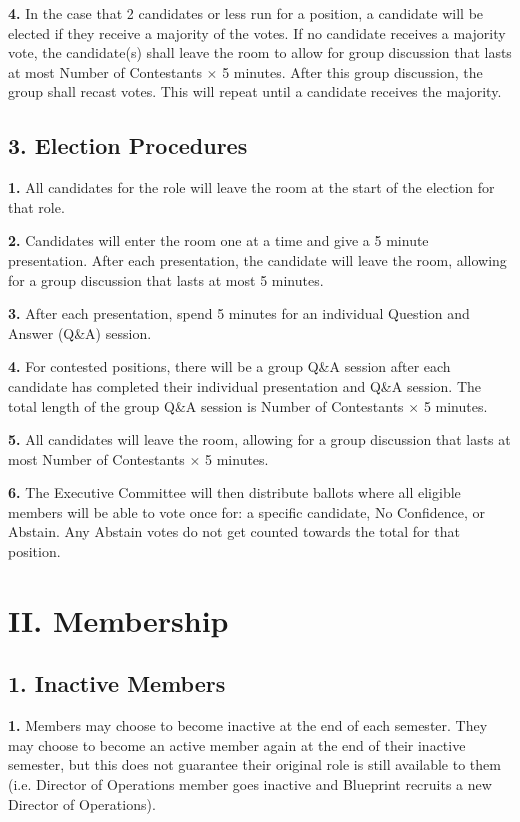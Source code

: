 \documentclass{article}
\begin{document}
\textbf{4.} In the case that 2 candidates or less run for a position, a candidate will be elected if they receive a majority of the votes. If no candidate receives a majority vote, the candidate(s) shall leave the room to allow for group discussion that lasts at most Number of Contestants $\times$ 5 minutes. After this group discussion, the group shall recast votes. This will repeat until a candidate receives the majority.  

\subsection{3. Election Procedures}

\textbf{1.} All candidates for the role will leave the room at the start of the election for that role. 

\textbf{2.} Candidates will enter the room one at a time and give a 5 minute presentation. After each presentation, the candidate will leave the room, allowing for a group discussion that lasts at most 5 minutes.

\textbf{3.} After each presentation, spend 5 minutes for an individual Question and Answer (Q\&A) session.

\textbf{4.} For contested positions, there will be a group Q\&A session after each candidate has completed their individual presentation and Q\&A session. The total length of the group Q\&A session is Number of Contestants $\times$ 5 minutes.

\textbf{5.} All candidates will leave the room, allowing for a group discussion that lasts at most Number of Contestants $\times $ 5 minutes. 

\textbf{6.} The Executive Committee will then distribute ballots where all eligible members will be able to vote once for: a specific candidate, No Confidence, or Abstain. Any Abstain votes do not get counted towards the total for that position. 

\section{II. Membership}

\subsection{1. Inactive Members}

\textbf{1.} Members may choose to become inactive at the end of each semester. They may choose to become an active member again at the end of their inactive semester, but this does not guarantee their original role is still available to them (i.e. Director of Operations member goes inactive and Blueprint recruits a new Director of Operations). 
\end{document}
